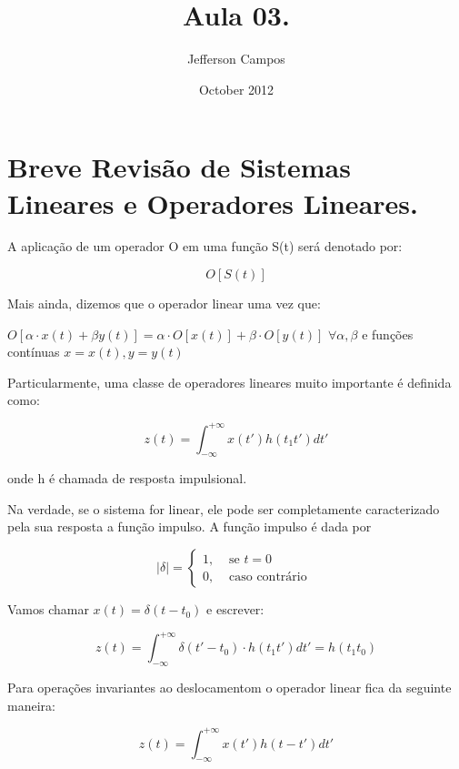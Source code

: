 \documentclass[a4paper,12pt]{article}
\title{Aula 03.}
\author{Jefferson Campos}
\date{October 2012}
\begin{document}

\section{Breve Revisão de Sistemas Lineares e Operadores Lineares.}

A aplicação de um operador O em uma função S(t) será denotado por:

$$ O[S(t)] $$

Mais ainda, dizemos que o operador linear uma vez que:

$ O[\alpha \cdot x(t) + \beta y(t)] = \alpha \cdot O[x(t)] + \beta \cdot O[y(t)] $ $ \forall \alpha,\beta$ e funções contínuas $x = x(t), y= y(t) $

Particularmente, uma classe de operadores lineares muito importante é definida como:

$$ z(t) = \int_{-\infty}^{+\infty }{x(t')h(t_1t') dt'} $$

onde h é chamada de resposta impulsional.

Na verdade, se o sistema for linear, ele pode ser completamente caracterizado pela sua resposta a função impulso. A função impulso é dada por

\begin{equation*}
|\delta|= 
\begin{cases}
1, & \text{ se } t= 0 \\ 
0, & \text{ caso contrário }
\end{cases}
\end{equation*}

Vamos chamar $x(t) = \delta(t - t_0) $ e escrever:

$$ z(t) = \int_{-\infty}^{+\infty }{\delta(t' - t_0) \cdot h(t_1t') dt'} = h(t_1t_0) $$

Para operações invariantes ao deslocamentom o operador linear fica da seguinte maneira:

$$ z(t) = \int_{-\infty}^{+\infty }{x(t') h(t - t') dt'} $$
\end{document}
